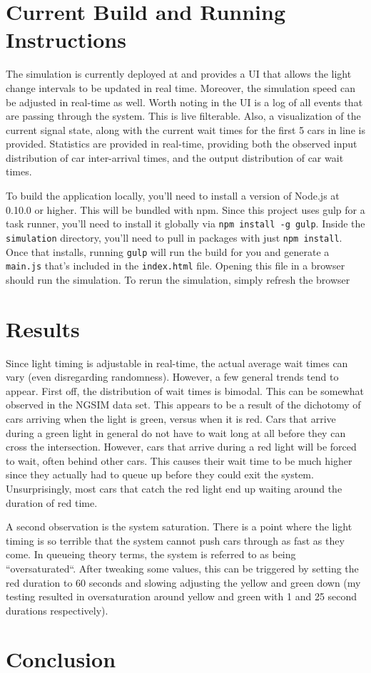 \documentclass[a4paper,12pt]{article}
\begin{document}
\section{Current Build and Running Instructions}
The simulation is currently deployed at \cite{aprilandchip} and provides a UI that allows the light change intervals to
be updated in real time. Moreover, the simulation speed can be adjusted in real-time as well. Worth noting in the UI is
a log of all events that are passing through the system. This is live filterable. Also, a visualization of the current
signal state, along with the current wait times for the first 5 cars in line is provided. Statistics are provided in
real-time, providing both the observed input distribution of car inter-arrival times, and the output distribution of
car wait times.

To build the application locally, you'll need to install a version of Node.js \cite{nodejs} at 0.10.0 or higher. This will be bundled
with npm. Since this project uses gulp for a task runner, you'll need to install it globally via
\texttt{npm install -g gulp}. Inside the \texttt{simulation} directory, you'll need to pull in packages with just
\texttt{npm install}. Once that installs, running \texttt{gulp} will run the build for you and generate a
\texttt{main.js} that's included in the \texttt{index.html} file. Opening this file in a browser should run the
simulation. To rerun the simulation, simply refresh the browser

\section{Results}
Since light timing is adjustable in real-time, the actual average wait times can vary (even disregarding randomness).
However, a few general trends tend to appear. First off, the distribution of wait times is bimodal. This can be
somewhat observed in the NGSIM data set. This appears to be a result of the dichotomy of cars arriving when the light
is green, versus when it is red. Cars that arrive during a green light in general do not have to wait long at all
before they can cross the intersection. However, cars that arrive during a red light will be forced to wait, often
behind other cars. This causes their wait time to be much higher since they actually had to queue up before they could
exit the system. Unsurprisingly, most cars that catch the red light end up waiting around the duration of red time.

A second observation is the system saturation. There is a point where the light timing is so terrible that the system
cannot push cars through as fast as they come. In queueing theory terms, the system is referred to as being
``oversaturated``. After tweaking some values, this can be triggered by setting the red duration to 60 seconds and
slowing adjusting the yellow and green down (my testing resulted in oversaturation around yellow and green with 1 and
25 second durations respectively).

\section{Conclusion}



\end{document}
